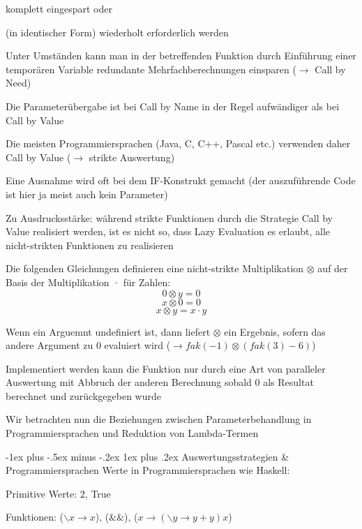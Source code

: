 \documentclass[10pt]{article}
\makeatletter
\renewcommand{\subsubsection}{\@startsection{subsubsection}{3}{0mm}%
                                {-1ex plus -.5ex minus -.2ex}%
                                {1ex plus .2ex}%
                                {\normalfont\small\bfseries}}
\makeatother
\begin{document}
\begin{itemize*}
    \begin{itemize*}
      \item komplett eingespart oder
      \item (in identischer Form) wiederholt erforderlich werden
      \item Unter Umständen kann man in der betreffenden Funktion durch Einführung einer temporären Variable redundante Mehrfachberechnungen einsparen ($\rightarrow$ Call by Need)
    \end{itemize*}
    \item Die Parameterübergabe ist bei Call by Name in der Regel aufwändiger als bei Call by Value
    \begin{itemize*}
      \item Die meisten Programmiersprachen (Java, C, C++, Pascal etc.) verwenden daher Call by Value ($\rightarrow$ strikte Auswertung)
      \item Eine Ausnahme wird oft bei dem IF-Konstrukt gemacht (der auszuführende Code ist hier ja meist auch kein Parameter)
    \end{itemize*}
    \item Zu Ausdrucksstärke: während strikte Funktionen durch die Strategie Call by Value realisiert werden, ist es nicht so, dass Lazy Evaluation es erlaubt, alle nicht-strikten Funktionen zu realisieren
    \begin{itemize*}
      \item Die folgenden Gleichungen definieren eine nicht-strikte Multiplikation $\otimes$ auf der Basis der Multiplikation · für Zahlen:
      $$0 \otimes y = 0$$
      $$x \otimes 0 = 0$$
      $$x \otimes y = x · y$$
      \item Wenn ein Arguemnt undefiniert ist, dann liefert $\otimes$ ein Ergebnis, sofern das andere Argument zu 0 evaluiert wird ($\rightarrow fak(-1) \otimes (fak(3)-6)$)
      \item Implementiert werden kann die Funktion nur durch eine Art von paralleler Auswertung mit Abbruch der anderen Berechnung sobald 0 als Resultat berechnet und zurückgegeben wurde
    \end{itemize*}
    \item Wir betrachten nun die Beziehungen zwischen Parameterbehandlung in Programmiersprachen und Reduktion von Lambda-Termen
  \end{itemize*}
  
  \subsubsection{Auswertungsstrategien \& Programmiersprachen}
  \color{blue} Werte in Programmiersprachen wie Haskell: \color{black}
  \begin{itemize*}
    \item Primitive Werte: 2, True
    \item Funktionen: ($\backslash x \rightarrow x$), ($\&\&$), ($x\rightarrow(\backslash y\rightarrow y+y)x$)
  \end{itemize*}
  
\end{document}
